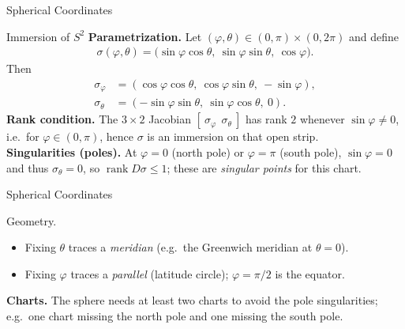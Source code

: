 \begin{frame}{Spherical Coordinates}
\vspace{-0.2cm}
\begin{block}{Immersion of $S^2$}
\textbf{Parametrization.} Let $(\varphi,\theta)\in(0,\pi)\times(0,2\pi)$ and define
\vspace{-0.3cm}
\begin{align*}
\sigma(\varphi,\theta)
=\big(\sin\varphi\cos\theta,\ \sin\varphi\sin\theta,\ \cos\varphi\big).
\end{align*}
Then
\vspace{-0.3cm}
\begin{align*}
\sigma_\varphi&=(\cos\varphi\cos\theta,\ \cos\varphi\sin\theta,\ -\sin\varphi),\\
\sigma_\theta&=(-\sin\varphi\sin\theta,\ \sin\varphi\cos\theta,\ 0).
\end{align*}
\textbf{Rank condition.} The $3\times 2$ Jacobian $[\ \sigma_\varphi\ \ \sigma_\theta\ ]$ has rank $2$ whenever $\sin\varphi\neq 0$, i.e.\ for $\varphi\in(0,\pi)$, hence $\sigma$ is an immersion on that open strip.\\
\textbf{Singularities (poles).} At $\varphi=0$ (north pole) or $\varphi=\pi$ (south pole), $\sin\varphi=0$ and thus $\sigma_\theta=0$, so $\operatorname{rank} D\sigma \le 1$; these are \emph{singular points} for this chart.
\end{block}
\end{frame}



\begin{frame}{Spherical Coordinates}
\begin{block}{Geometry.}
\begin{itemize}
\item Fixing $\theta$ traces a \emph{meridian} (e.g.\ the Greenwich meridian at $\theta=0$).
\item Fixing $\varphi$ traces a \emph{parallel} (latitude circle); $\varphi=\pi/2$ is the equator.
\end{itemize}

\textbf{Charts.} The sphere needs at least two charts to avoid the pole singularities; e.g.\ one chart missing the north pole and one missing the south pole.
\end{block}
\end{frame}

